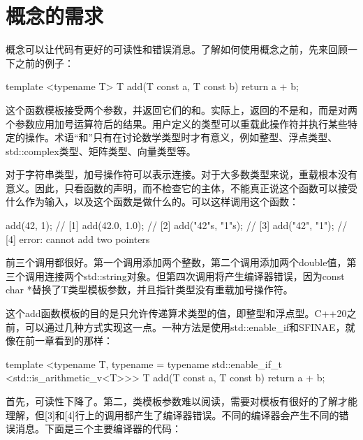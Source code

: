 \section{概念的需求}
概念可以让代码有更好的可读性和错误消息。了解如何使用概念之前，先来回顾一下之前的例子：

\begin{cppcode}
template <typename T>
T add(T const a, T const b)
{
	return a + b;
}
\end{cppcode}

这个函数模板接受两个参数，并返回它们的和。实际上，返回的不是和，而是对两个参数应用加号运算符后的结果。用户定义的类型可以重载此操作符并执行某些特定的操作。术语“和”只有在讨论数学类型时才有意义，例如整型、浮点类型、std::complex类型、矩阵类型、向量类型等。

对于字符串类型，加号操作符可以表示连接。对于大多数类型来说，重载根本没有意义。因此，只看函数的声明，而不检查它的主体，不能真正说这个函数可以接受什么作为输入，以及这个函数是做什么的。可以这样调用这个函数：

\begin{cppcode}
add(42, 1); // [1]
add(42.0, 1.0); // [2]
add("42"s, "1"s); // [3]
add("42", "1"); // [4] error: cannot add two pointers
\end{cppcode}

前三个调用都很好。第一个调用添加两个整数，第二个调用添加两个double值，第三个调用连接两个std::string对象。但第四次调用将产生编译器错误，因为const char *替换了T类型模板参数，并且指针类型没有重载加号操作符。

这个add函数模板的目的是只允许传递算术类型的值，即整型和浮点型。C++20之前，可以通过几种方式实现这一点。一种方法是使用std::enable_if和SFINAE，就像在前一章看到的那样：

\begin{cppcode}
template <typename T,
	typename = typename std::enable_if_t
		<std::is_arithmetic_v<T>>>
T add(T const a, T const b)
{
	return a + b;
}
\end{cppcode}

首先，可读性下降了。第二，类模板参数难以阅读，需要对模板有很好的了解才能理解，但[3]和[4]行上的调用都产生了编译器错误。不同的编译器会产生不同的错误消息。下面是三个主要编译器的代码：


